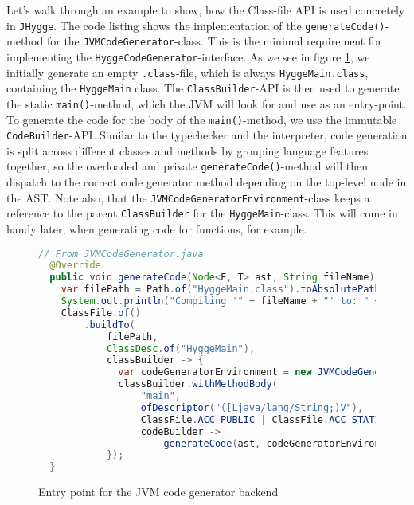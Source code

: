Let's walk through an example to show, how the Class-file API is used concretely in \texttt{JHygge}. The code listing  shows
the implementation of the \texttt{generateCode()}-method for the \texttt{JVMCodeGenerator}-class. This is the minimal requirement
for implementing the \texttt{HyggeCodeGenerator}-interface. As we see in figure \ref{fig:codegen_main}, we initially generate an empty \texttt{.class}-file,
which is always \texttt{HyggeMain.class}, containing the \texttt{HyggeMain} class. The \texttt{ClassBuilder}-API is then used to
generate the static \texttt{main()}-method, which the JVM will look for and use as an entry-point. To generate the code for
the body of the \texttt{main()}-method, we use the immutable \texttt{CodeBuilder}-API. Similar to the typechecker and the interpreter,
code generation is split across different classes and methods by grouping language features together, so the overloaded and private
\texttt{generateCode()}-method will then dispatch to the correct code generator method depending on the top-level node in the AST.
Note also, that the \texttt{JVMCodeGeneratorEnvironment}-class keeps a reference to the parent \texttt{ClassBuilder} for the
\texttt{HyggeMain}-class. This will come in handy later, when generating code for functions, for example.

\begin{figure}[H]
\centering 
\begin{lstlisting}[language=Java]
  // From JVMCodeGenerator.java
  @Override
  public void generateCode(Node<E, T> ast, String fileName) throws IOException {
    var filePath = Path.of("HyggeMain.class").toAbsolutePath();
    System.out.println("Compiling '" + fileName + "' to: " + filePath);
    ClassFile.of()
        .buildTo(
            filePath,
            ClassDesc.of("HyggeMain"),
            classBuilder -> {
              var codeGeneratorEnvironment = new JVMCodeGeneratorEnvironment(classBuilder);
              classBuilder.withMethodBody(
                  "main",
                  ofDescriptor("([Ljava/lang/String;)V"),
                  ClassFile.ACC_PUBLIC | ClassFile.ACC_STATIC,
                  codeBuilder ->
                      generateCode(ast, codeGeneratorEnvironment, codeBuilder).return_());
            });
  }
\end{lstlisting}
\caption{Entry point for the JVM code generator backend}
\label{fig:codegen_main}
\end{figure}

